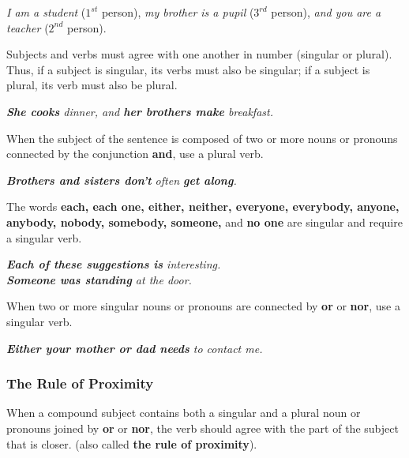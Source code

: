 \documentclass[hidelinks,10pt,a4paper]{article}
\begin{document}
\begin{center}
	\textit{I am a student} ($1^{st}$ person), \textit{my brother is a pupil} ($3^{rd}$ person), \textit{and you are a teacher} ($2^{nd}$ person).
\end{center}

Subjects and verbs must agree with one another in number (singular or plural). Thus, if a subject is singular, its verbs must also be singular; if a subject is plural, its verb must also be plural.

\begin{center}
	\textit{ \textbf{She cooks} dinner, and \textbf{her brothers make} breakfast.}
\end{center}

When the subject of the sentence is composed of two or more nouns or pronouns connected by the conjunction \textbf{and}, use a plural verb.

\begin{center}
	\textit{ \textbf{Brothers and sisters don't} often \textbf{get along}. }
\end{center}

The words \textbf{each, each one, either, neither, everyone, everybody, anyone, anybody, nobody, somebody, someone,} and \textbf{no one} are singular and require a singular verb.

\begin{center}
	\textit{ \textbf{Each of these suggestions is} interesting. \\
	\textbf{Someone was standing} at the door.}
\end{center}

When two or more singular nouns or pronouns are connected by \textbf{or} or \textbf{nor}, use a singular verb.

\begin{center}
	\textit{ \textbf{Either your mother or dad needs} to contact me.}
\end{center}

\subsubsection{The Rule of Proximity}

When a compound subject contains both a singular and a plural noun or pronouns joined by \textbf{or} or \textbf{nor}, the verb should agree with the part of the subject that is closer. (also called \textbf{the rule of proximity}). \\
\end{document}
